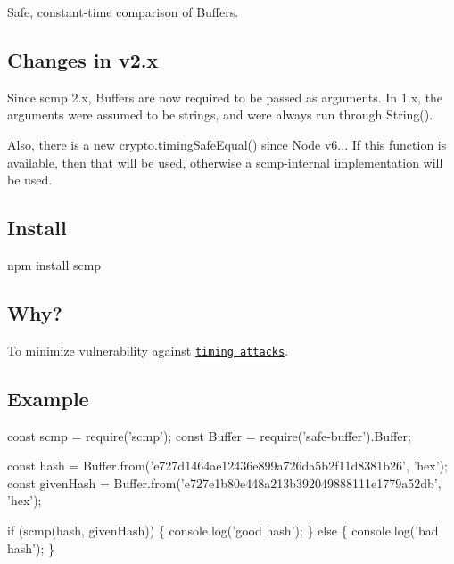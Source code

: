 \href{https://travis-ci.org/freewil/scmp}{\tt } \href{https://npmjs.org/package/scmp}{\tt } \href{https://npmjs.org/package/scmp}{\tt }

Safe, constant-\/time comparison of Buffers.

\subsection*{Changes in v2.\+x}

Since scmp 2.\+x, Buffers are now required to be passed as arguments. In 1.\+x, the arguments were assumed to be strings, and were always run through {\ttfamily String()}.

Also, there is a new {\ttfamily crypto.\+timing\+Safe\+Equal()} since Node v6... If this function is available, then that will be used, otherwise a scmp-\/internal implementation will be used.

\subsection*{Install}


\begin{DoxyCode}
npm install scmp
\end{DoxyCode}


\subsection*{Why?}

To minimize vulnerability against \href{http://codahale.com/a-lesson-in-timing-attacks/}{\tt timing attacks}.

\subsection*{Example}


\begin{DoxyCode}
const scmp = require('scmp');
const Buffer = require('safe-buffer').Buffer;

const hash      = Buffer.from('e727d1464ae12436e899a726da5b2f11d8381b26', 'hex');
const givenHash = Buffer.from('e727e1b80e448a213b392049888111e1779a52db', 'hex');

if (scmp(hash, givenHash)) \{
  console.log('good hash');
\} else \{
  console.log('bad hash');
\}
\end{DoxyCode}
 